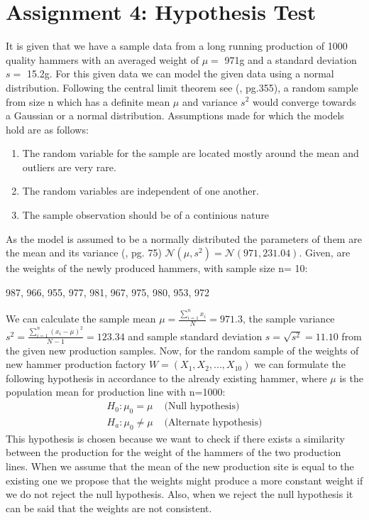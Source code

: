 \chapter{Assignment 4: Hypothesis Test}
It is given that we have a sample data from a long running production of 1000 quality hammers with an averaged weight of $\mu =$ 971g and a standard deviation $s= $ 15.2g. For this given data we can model the given data using a normal distribution. Following the central limit theorem see (\cite{hogg:2005}, pg.355), a random sample from size n which has a definite mean $\mu $ and variance $s^2$ would converge towards a Gaussian or a normal distribution. Assumptions made for which the models hold are as follows:
\begin{enumerate}
    \item The random variable for the sample are located mostly around the mean and outliers are very rare.
    \item The random variables are independent of one another.
    \item The sample observation should be of a continious nature
\end{enumerate}
As the model is assumed to be a normally distributed the parameters of them are the mean and its variance (\cite{Iubh:2021}, pg. 75) $\mathcal{N}(\mu, s^2) = \mathcal{N}(971, 231.04)$.\newline
Given, are the weights of the newly produced hammers, with sample size n= 10:
\begin{center}
    987, 966, 955, 977, 981, 967, 975, 980, 953, 972
\end{center} 
We can calculate the sample mean $\mu = \frac{\sum_{i=1}^{n}x_i}{N}=971.3$, the sample variance $s^2=\frac{\sum_{i=1}^{n}(x_i-\mu)^2}{N-1} = 123.34$ and sample standard deviation $s=\sqrt{s^2}=11.10$ from the given new production samples.
Now, for the random sample of the weights of new hammer production factory $W = (X_1, X_2, ..., X_{10})$ we can formulate the following hypothesis in accordance to the already existing hammer, where $\mu$ is the population mean for production line with n=1000:\newline
\begin{equation}
    \begin{split}
      H_0 : \mu_0 = \mu& \text{ (Null hypothesis)}\\
      H_a: \mu_0 \neq \mu& \text{ (Alternate hypothesis)}
    \end{split}
\end{equation}
This hypothesis is chosen because we want to check if there exists a similarity between the production for the weight of the hammers of the two production lines. When we assume that the mean of the new production site is equal to the existing one we propose that the weights might produce a more constant weight if we do not reject the null hypothesis. Also, when we reject the null hypothesis it can be said that the weights are not consistent.\newline\newline
